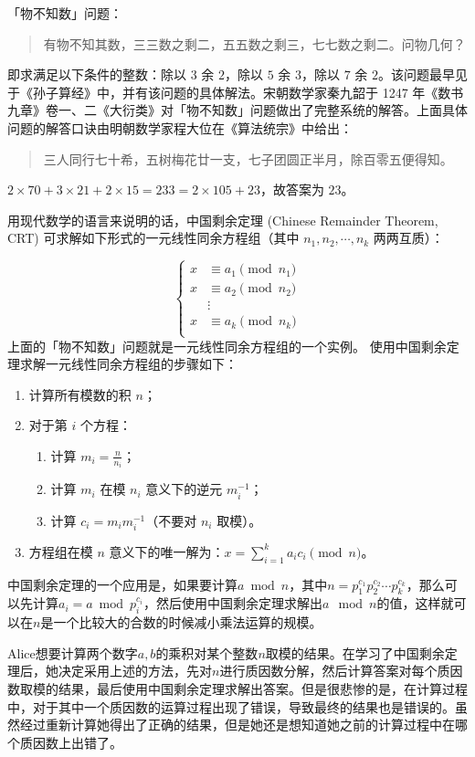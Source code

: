 「物不知数」问题：
\begin{quote}
  有物不知其数，三三数之剩二，五五数之剩三，七七数之剩二。问物几何？
\end{quote}
即求满足以下条件的整数：除以 \(3\) 余 \(2\)，除以 \(5\) 余 \(3\)，除以
\(7\) 余 \(2\)。该问题最早见于《孙子算经》中，并有该问题的具体解法。宋朝数学家秦九韶于
1247
年《数书九章》卷一、二《大衍类》对「物不知数」问题做出了完整系统的解答。上面具体问题的解答口诀由明朝数学家程大位在《算法统宗》中给出：
\begin{quote}
  三人同行七十希，五树梅花廿一支，七子团圆正半月，除百零五便得知。
\end{quote}
\(2\times 70+3\times 21+2\times 15=233=2\times 105+23\)，故答案为
\(23\)。

用现代数学的语言来说明的话，中国剩余定理 (Chinese Remainder Theorem, CRT)
可求解如下形式的一元线性同余方程组（其中 \(n_1, n_2, \cdots, n_k\)
两两互质）：

\[
  \left\{  \begin{aligned}
    x & \equiv a_1 \pmod {n_1} \\
    x & \equiv a_2 \pmod {n_2} \\
      & \vdots                 \\
    x & \equiv a_k \pmod {n_k} \\
  \end{aligned}\right.
\]
上面的「物不知数」问题就是一元线性同余方程组的一个实例。
使用中国剩余定理求解一元线性同余方程组的步骤如下：
\begin{enumerate}
  \item
        计算所有模数的积 \(n\)；
  \item
        对于第 \(i\) 个方程：

        \begin{enumerate}
          \item
                计算 \(m_i=\frac{n}{n_i}\)；
          \item
                计算 \(m_i\) 在模 \(n_i\) 意义下的逆元
                \(m_i^{-1}\)；
          \item
                计算 \(c_i=m_im_i^{-1}\)（不要对 \(n_i\) 取模）。
        \end{enumerate}
  \item
        方程组在模 \(n\) 意义下的唯一解为：\(x=\sum_{i=1}^k a_ic_i \pmod n\)。
\end{enumerate}
中国剩余定理的一个应用是，如果要计算$a\bmod n$，其中$n=p_1^{c_1}p_2^{c_2}\cdots p_k^{c_k}$，那么可以先计算$a_i=a\bmod p_i^{c_i}$，然后使用中国剩余定理求解出$a\mod n$的值，这样就可以在$n$是一个比较大的合数的时候减小乘法运算的规模。

Alice想要计算两个数字$a,b$的乘积对某个整数$n$取模的结果。在学习了中国剩余定理后，她决定采用上述的方法，先对$n$进行质因数分解，然后计算答案对每个质因数取模的结果，最后使用中国剩余定理求解出答案。但是很悲惨的是，在计算过程中，对于其中一个质因数的运算过程出现了错误，导致最终的结果也是错误的。虽然经过重新计算她得出了正确的结果，但是她还是想知道她之前的计算过程中在哪个质因数上出错了。